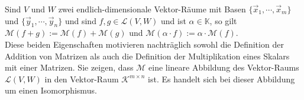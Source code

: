 \remark
Sind $V$ und $W$ zwei endlich-dimensionale Vektor-R\"{a}ume mit Basen
$\{\vec{x}_1, \cdots, \vec{x}_m\}$ und $\{\vec{y}_1, \cdots, \vec{y}_n\}$ und sind $f, g \in \mathcal{L}(V, W)$ und ist $\alpha \in \mathbb{K}$, so gilt
\\[0.2cm]
\hspace*{1.3cm}
$\mathcal{M}(f+g) := \mathcal{M}(f) + \mathcal{M}(g)$ \quad und \quad
$\mathcal{M}(\alpha \cdot f) := \alpha \cdot \mathcal{M}(f)$.
\\[0.2cm]
Diese beiden Eigenschaften motivieren nachtr\"{a}glich sowohl die Definition der Addition von Matrizen
als auch die Definition der Multiplikation eines Skalars mit einer Matrizen.  
Sie zeigen, dass $\mathcal{M}$ eine lineare Abbildung des Vektor-Raums $\mathcal{L}(V,W)$ in den Vektor-Raum $\mathcal{K}^{m \times n}$ ist.  
Es handelt sich bei dieser Abbildung um einen Isomorphismus.
\eoxs



